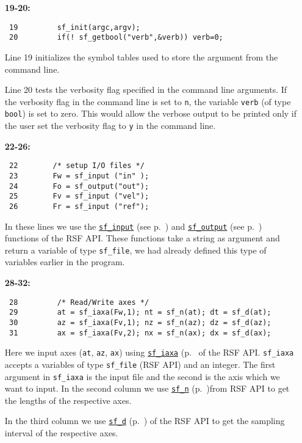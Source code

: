 \begin{itemize}
\item [\bf 19-20:]
\begin{verbatim}
 19	        sf_init(argc,argv);
 20         if(! sf_getbool("verb",&verb)) verb=0;
\end{verbatim}
	
Line 19 initializes the symbol tables used to store the argument from the command line.
	  
Line 20 tests the verbosity flag specified in the command line arguments. If the verbosity flag in the command line is set to \texttt{n}, the variable \texttt{verb} (of type \texttt{bool}) is set to zero. This would allow the verbose output to be printed only if the user set the verbosity flag to \texttt{y} in the command line. 


\item [\bf 22-26:]
\begin{verbatim}
 22        /* setup I/O files */
 23   	   Fw = sf_input ("in" );
 24   	   Fo = sf_output("out");
 25   	   Fv = sf_input ("vel");
 26   	   Fr = sf_input ("ref");
\end{verbatim}

In these lines we use the \hyperref[sec:sf_input]{\texttt{sf\_input}} (see p.~\pageref{sec:sf_input}) and \hyperref[sec:sf_output]{\texttt{sf\_output}} (see p.~\pageref{sec:sf_input}) functions of	    the RSF API. These functions take a string as argument and return a variable of type \texttt{sf\_file}, we had already defined this type of variables earlier in the program. 
           
\item [\bf 28-32:]
\begin{verbatim}
 28         /* Read/Write axes */
 29         at = sf_iaxa(Fw,1); nt = sf_n(at); dt = sf_d(at);
 30         az = sf_iaxa(Fv,1); nz = sf_n(az); dz = sf_d(az);
 31         ax = sf_iaxa(Fv,2); nx = sf_n(ax); dx = sf_d(ax);
\end{verbatim}

Here we input axes (\texttt{at}, \texttt{az}, \texttt{ax}) using \hyperref[sec:sf_iaxa]{\texttt{sf\_iaxa}} (p.~\pageref{sec:sf_iaxa} of the RSF API. \texttt{sf\_iaxa} accepts a variables of type \texttt{sf\_file} (RSF API) and an integer. The first argument in \texttt{sf\_iaxa} is the input file and the second is the axis which we want to input. In the second column we use \hyperref[sec:sf_n]{\texttt{sf\_n}} (p.~\pageref{sec:sf_n})from RSF API to get the lengths of the respective axes.

In the third column we use \hyperref[sec:sf_d]{\texttt{sf\_d}} (p.~\pageref{sec:sf_d}) of the RSF API to get the sampling interval of the respective axes.


\end{itemize}
